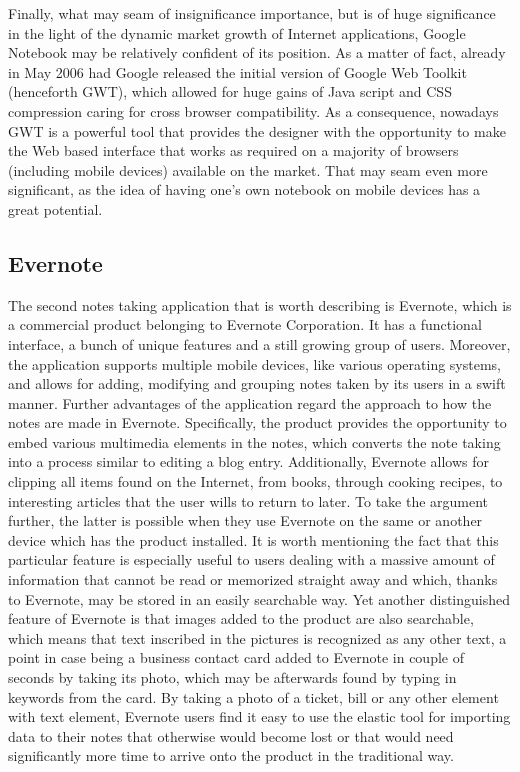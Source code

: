 Finally, what may seam of insignificance importance, but is of huge significance in the light of the dynamic market growth of Internet applications, Google Notebook may be relatively confident of its position. As a matter of fact, already in May 2006 had Google released the initial version of Google Web Toolkit (henceforth GWT), which allowed for huge gains of Java script and CSS compression caring for cross browser compatibility. As a consequence, nowadays GWT is a powerful tool that provides the designer with the opportunity to make the Web based interface that works as required on a majority of browsers (including mobile devices) available on the market. That may seam even more significant, as the idea of having one's own notebook on mobile devices has a great potential. 

\subsection{Evernote}\label{subsec:evernote}
The second notes taking application that is worth describing is Evernote, which is a commercial product belonging to Evernote Corporation. It has a functional interface, a bunch of unique features and a still growing group of users. Moreover, the application supports multiple mobile devices, like various operating systems, and allows for adding, modifying and grouping notes taken by its users in a swift manner. Further advantages of the application regard the approach to how the notes are made in Evernote. Specifically, the product provides the opportunity to embed various multimedia elements in the notes, which converts the note taking into a process similar to editing a blog entry. Additionally, Evernote allows for clipping all items found on the Internet, from books, through cooking recipes, to interesting articles that the user wills to return to later. To take the argument further, the latter is possible when they use Evernote on the same or another device which has the product installed. It is worth mentioning the fact that this particular feature is especially useful to users dealing with a massive amount of information that cannot be read or memorized straight away and which, thanks to Evernote, may be stored in an easily searchable way. Yet another distinguished feature of Evernote is that images added to the product are also searchable, which means that text inscribed in the pictures is recognized as any other text, a point in case being a business contact card added to Evernote in couple of seconds by taking its photo, which may be afterwards found by typing in keywords from the card. By taking a photo of a ticket, bill or any other element with text element, Evernote users find it easy to use the elastic tool for importing data to their notes that otherwise would become lost or that would need significantly more time to arrive onto the product in the traditional way.

